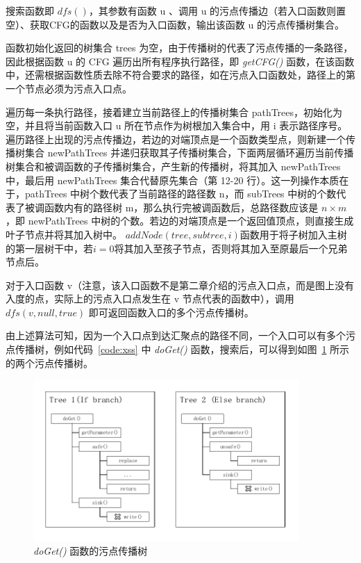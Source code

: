 搜索函数即 $dfs()$，其参数有函数 u 、调用 u 的污点传播边（若入口函数则置空）、获取CFG的函数以及是否为入口函数，输出该函数 u 的污点传播树集合。

函数初始化返回的树集合 trees 为空，由于传播树的代表了污点传播的一条路径，因此根据函数 u 的 CFG 遍历出所有程序执行路径，即 \textit{getCFG()} 函数，在该函数中，还需根据函数性质去除不符合要求的路径，如在污点入口函数处，路径上的第一个节点必须为污点入口点。

遍历每一条执行路径，接着建立当前路径上的传播树集合 pathTrees，初始化为空，并且将当前函数入口 u 所在节点作为树根加入集合中，用 i 表示路径序号。遍历路径上出现的污点传播边，若边的对端顶点是一个函数类型点，则新建一个传播树集合 newPathTrees 并递归获取其子传播树集合，下面两层循环遍历当前传播树集合和被调函数的子传播树集合，产生新的传播树，将其加入 newPathTrees 中，最后用 newPathTrees 集合代替原先集合（第 12-20 行）。这一列操作本质在于，pathTrees 中树个数代表了当前路径的路径数 n，而 subTrees 中树的个数代表了被调函数内有的路径树 m，那么执行完被调函数后，总路径数应该是 $n \times m$，即 newPathTrees 中树的个数。若边的对端顶点是一个返回值顶点，则直接生成叶子节点并将其加入树中。
$addNode(tree, subtree, i)$函数用于将子树加入主树的第一层树干中，若$i=0$将其加入至孩子节点，否则将其加入至原最后一个兄弟节点后。

对于入口函数 v（注意，该入口函数不是第二章介绍的污点入口点，而是图上没有入度的点，实际上的污点入口点发生在 v 节点代表的函数中），调用$dfs(v, null,true)$ 即可返回函数入口的多个污点传播树。

由上述算法可知，因为一个入口点到达汇聚点的路径不同，一个入口可以有多个污点传播树，例如代码~\ref{code:xss} 中 \textit{doGet()} 函数，搜索后，可以得到如图~\ref{taintTree} 所示的两个污点传播树。

\begin{figure}[!htb]
    \centering
    \includegraphics[width=0.9\textwidth]{FIGs/chapter4/taintTree.pdf}
    \caption{\textit{doGet()} 函数的污点传播树}\label{taintTree}
\end{figure}


